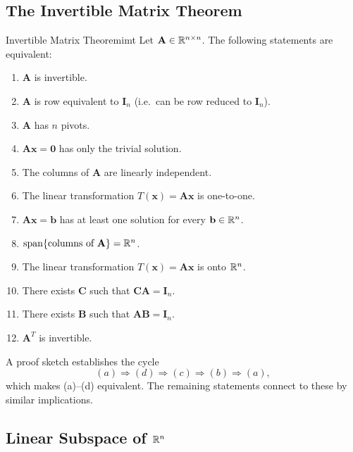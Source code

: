 \subsection{The Invertible Matrix Theorem}

\begin{theorem}{Invertible Matrix Theorem}{imt}
  Let $\mathbf{A} \in \mathbb{R}^{n \times n}$. The following statements are equivalent:
  \begin{enumerate}[label=(\alph*)]
    \item $\mathbf{A}$ is invertible.
    \item $\mathbf{A}$ is row equivalent to $\mathbf{I}_n$ (i.e.\ can be row reduced to $\mathbf{I}_n$).
    \item $\mathbf{A}$ has $n$ pivots.
    \item $\mathbf{A}\mathbf{x} = \mathbf{0}$ has only the trivial solution.
    \item The columns of $\mathbf{A}$ are linearly independent.
    \item The linear transformation $T(\mathbf{x}) = \mathbf{A}\mathbf{x}$ is one-to-one.
    \item $\mathbf{A}\mathbf{x} = \mathbf{b}$ has at least one solution for every $\mathbf{b} \in \mathbb{R}^n$.
    \item $\operatorname{span}\{\text{columns of }\mathbf{A}\} = \mathbb{R}^n$.
    \item The linear transformation $T(\mathbf{x}) = \mathbf{A}\mathbf{x}$ is onto $\mathbb{R}^n$.
    \item There exists $\mathbf{C}$ such that $\mathbf{C}\mathbf{A} = \mathbf{I}_n$.
    \item There exists $\mathbf{B}$ such that $\mathbf{A}\mathbf{B} = \mathbf{I}_n$.
    \item $\mathbf{A}^T$ is invertible.
  \end{enumerate}
\end{theorem}

\begin{remark}
  A proof sketch establishes the cycle
  \[
    (a) \Longrightarrow (d) \Longrightarrow (c) \Longrightarrow (b) \Longrightarrow (a),
  \]
  which makes (a)--(d) equivalent. The remaining statements connect to these by similar implications.
\end{remark}

\subsection{Linear Subspace of $\mathbb{R}^n$}

